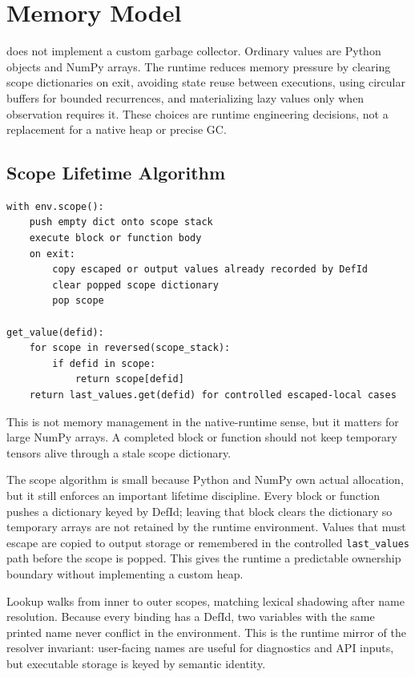 \section{Memory Model}

\einlang{} does not implement a custom garbage collector. Ordinary values are
Python objects and NumPy arrays. The runtime reduces memory pressure by clearing
scope dictionaries on exit, avoiding state reuse between executions, using
circular buffers for bounded recurrences, and materializing lazy values only
when observation requires it. These choices are runtime engineering decisions,
not a replacement for a native heap or precise GC.

\subsection{Scope Lifetime Algorithm}

\begin{lstlisting}[style=pythoncode,caption={DefId-keyed scope lifetime.}]
with env.scope():
    push empty dict onto scope stack
    execute block or function body
    on exit:
        copy escaped or output values already recorded by DefId
        clear popped scope dictionary
        pop scope

get_value(defid):
    for scope in reversed(scope_stack):
        if defid in scope:
            return scope[defid]
    return last_values.get(defid) for controlled escaped-local cases
\end{lstlisting}

This is not memory management in the native-runtime sense, but it matters for
large NumPy arrays. A completed block or function should not keep temporary
tensors alive through a stale scope dictionary.

The scope algorithm is small because Python and NumPy own actual allocation,
but it still enforces an important lifetime discipline. Every block or function
pushes a dictionary keyed by DefId; leaving that block clears the dictionary so
temporary arrays are not retained by the runtime environment. Values that must
escape are copied to output storage or remembered in the controlled
\texttt{last\_values} path before the scope is popped. This gives the runtime a
predictable ownership boundary without implementing a custom heap.

Lookup walks from inner to outer scopes, matching lexical shadowing after name
resolution. Because every binding has a DefId, two variables with the same
printed name never conflict in the environment. This is the runtime mirror of
the resolver invariant: user-facing names are useful for diagnostics and API
inputs, but executable storage is keyed by semantic identity.

